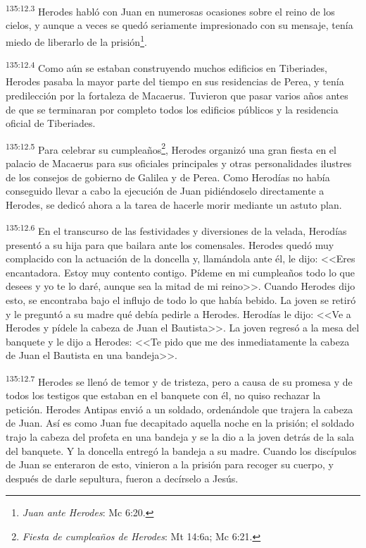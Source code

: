 \par 
\textsuperscript{135:12.3} Herodes habló con Juan en numerosas ocasiones sobre el reino de los cielos, y aunque a veces se quedó seriamente impresionado con su mensaje, tenía miedo de liberarlo de la prisión\footnote{\textit{Juan ante Herodes}: Mc 6:20.}.

\par 
\textsuperscript{135:12.4} Como aún se estaban construyendo muchos edificios en Tiberiades, Herodes pasaba la mayor parte del tiempo en sus residencias de Perea, y tenía predilección por la fortaleza de Macaerus. Tuvieron que pasar varios años antes de que se terminaran por completo todos los edificios públicos y la residencia oficial de Tiberiades.

\par 
\textsuperscript{135:12.5} Para celebrar su cumpleaños\footnote{\textit{Fiesta de cumpleaños de Herodes}: Mt 14:6a; Mc 6:21.}, Herodes organizó una gran fiesta en el palacio de Macaerus para sus oficiales principales y otras personalidades ilustres de los consejos de gobierno de Galilea y de Perea. Como Herodías no había conseguido llevar a cabo la ejecución de Juan pidiéndoselo directamente a Herodes, se dedicó ahora a la tarea de hacerle morir mediante un astuto plan.

\par 
\textsuperscript{135:12.6} En el transcurso de las festividades y diversiones de la velada, Herodías presentó a su hija para que bailara ante los comensales. Herodes quedó muy complacido con la actuación de la doncella y, llamándola ante él, le dijo: <<Eres encantadora. Estoy muy contento contigo. Pídeme en mi cumpleaños todo lo que desees y yo te lo daré, aunque sea la mitad de mi reino>>. Cuando Herodes dijo esto, se encontraba bajo el influjo de todo lo que había bebido. La joven se retiró y le preguntó a su madre qué debía pedirle a Herodes. Herodías le dijo: <<Ve a Herodes y pídele la cabeza de Juan el Bautista>>. La joven regresó a la mesa del banquete y le dijo a Herodes: <<Te pido que me des inmediatamente la cabeza de Juan el Bautista en una bandeja>>.

\par 
\textsuperscript{135:12.7} Herodes se llenó de temor y de tristeza, pero a causa de su promesa y de todos los testigos que estaban en el banquete con él, no quiso rechazar la petición. Herodes Antipas envió a un soldado, ordenándole que trajera la cabeza de Juan. Así es como Juan fue decapitado aquella noche en la prisión; el soldado trajo la cabeza del profeta en una bandeja y se la dio a la joven detrás de la sala del banquete. Y la doncella entregó la bandeja a su madre. Cuando los discípulos de Juan se enteraron de esto, vinieron a la prisión para recoger su cuerpo, y después de darle sepultura, fueron a decírselo a Jesús.